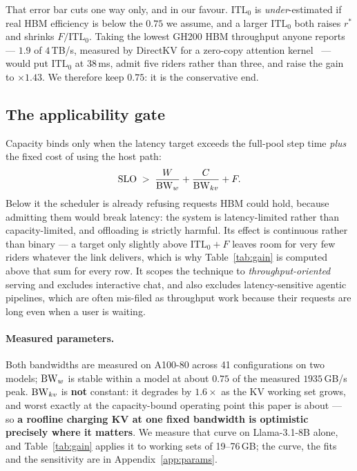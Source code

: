 That error bar cuts one way only, and in our favour. $\mathrm{ITL}_0$ is
\emph{under}-estimated if real HBM efficiency is below the $0.75$ we assume, and a
larger $\mathrm{ITL}_0$ both raises $r^{*}$ and shrinks $F/\mathrm{ITL}_0$. Taking
the lowest GH200 HBM throughput anyone reports --- $1.9$ of $4$\,TB/s, measured by
DirectKV for a zero-copy attention kernel~\cite{directkv} --- would put
$\mathrm{ITL}_0$ at $38$\,ms, admit five riders rather than three, and raise the
gain to $\times 1.43$. We therefore keep $0.75$: it is the conservative end.

\subsection{The applicability gate}
\label{sec:model:gate}

Capacity binds only when the latency target exceeds the full-pool step time
\emph{plus} the fixed cost of using the host path:
%
\begin{equation}
\label{eq:gate}
\mathrm{SLO} \;>\; \frac{W}{\mathrm{BW}_w} + \frac{C}{\mathrm{BW}_{kv}} + F.
\end{equation}
%
Below it the scheduler is already refusing requests HBM could hold, because
admitting them would break latency: the system is latency-limited rather than
capacity-limited, and offloading is strictly harmful. Its effect is continuous
rather than binary --- a target only slightly above $\mathrm{ITL}_0 + F$ leaves room
for very few riders whatever the link delivers, which is why Table~\ref{tab:gain} is
computed above that sum for every row. It scopes the technique to
\emph{throughput-oriented} serving and excludes interactive chat, and also excludes
latency-sensitive agentic pipelines, which are often mis-filed as throughput work
because their requests are long even when a user is waiting.

\paragraph{Measured parameters.}
\label{sec:model:params}
Both bandwidths are measured on A100-80 across 41 configurations on two models;
$\mathrm{BW}_w$ is stable within a model at about $0.75$ of the measured $1935$\,GB/s peak.
$\mathrm{BW}_{kv}$ is \textbf{not} constant: it degrades by $1.6\times$ as the KV working
set grows, and worst exactly at the capacity-bound operating point this paper is
about --- so \textbf{a roofline charging KV at one fixed bandwidth is optimistic
precisely where it matters}. We measure that curve on Llama-3.1-8B alone, and
Table~\ref{tab:gain} applies it to working sets of 19--76\,GB; the curve, the fits
and the sensitivity are in Appendix~\ref{app:params}.

